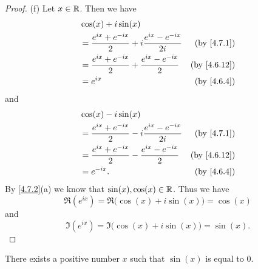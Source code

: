\begin{proof}{(f)}
  Let \(x \in \mathbb{R}\).
  Then we have
  \begin{align*}
     & \cos(x) + i \sin(x)                                                                            \\
     & = \frac{e^{i x} + e^{- i x}}{2} + i \frac{e^{i x} - e^{- i x}}{2i} & \text{(by \cref{4.7.1})}  \\
     & = \frac{e^{i x} + e^{- i x}}{2} + \frac{e^{i x} - e^{- i x}}{2}    & \text{(by \cref{4.6.12})} \\
     & = e^{i x}                                                          & \text{(by \cref{4.6.4})}
  \end{align*}
  and
  \begin{align*}
     & \cos(x) - i \sin(x)                                                                            \\
     & = \frac{e^{i x} + e^{- i x}}{2} - i \frac{e^{i x} - e^{- i x}}{2i} & \text{(by \cref{4.7.1})}  \\
     & = \frac{e^{i x} + e^{- i x}}{2} - \frac{e^{i x} - e^{- i x}}{2}    & \text{(by \cref{4.6.12})} \\
     & = e^{- i x}.                                                       & \text{(by \cref{4.6.4})}
  \end{align*}
  By \cref{4.7.2}(a) we know that \(\sin(x), \cos(x) \in \mathbb{R}\).
  Thus we have
  \[
    \Re(e^{i x}) = \Re\big(\cos(x) + i \sin(x)\big) = \cos(x)
  \]
  and
  \[
    \Im(e^{i x}) = \Im\big(\cos(x) + i \sin(x)\big) = \sin(x).
  \]
\end{proof}

\begin{lem}\label{4.7.3}
  There exists a positive number \(x\) such that \(\sin(x)\) is equal to \(0\).
\end{lem}

